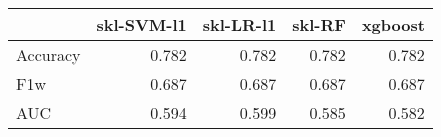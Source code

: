 \begin{tabular}{lrrrr}
\toprule
{} &  skl-SVM-l1 &  skl-LR-l1 &  skl-RF &  xgboost \\
\midrule
Accuracy &       0.782 &      0.782 &   0.782 &    0.782 \\
F1w      &       0.687 &      0.687 &   0.687 &    0.687 \\
AUC      &       0.594 &      0.599 &   0.585 &    0.582 \\
\bottomrule
\end{tabular}
